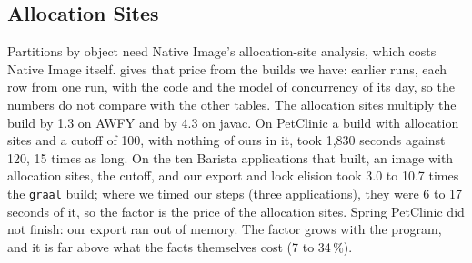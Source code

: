 \subsection{Allocation Sites}\label{sec:eval-cost-sites}

Partitions by object need Native Image's allocation-site analysis, which costs Native Image itself.  gives
that price from the builds we have: earlier runs, each row from one run, with the code and the model of concurrency of its day,
so the numbers do not compare with the other tables. The allocation sites multiply the build by 1.3 on AWFY and by 4.3 on javac.
On PetClinic a build with allocation sites and a cutoff of 100, with nothing of ours in it, took 1,830 seconds against 120, 15
times as long. On the ten Barista applications that built, an image with allocation sites, the cutoff, and our export and lock
elision took 3.0 to 10.7 times the \texttt{graal} build; where we timed our steps (three applications), they were 6 to 17
seconds of it, so the factor is the price of the allocation sites. Spring PetClinic did not finish: our export ran out of
memory. The factor grows with the program, and it is far above what the facts themselves cost (7 to 34\,\%).

